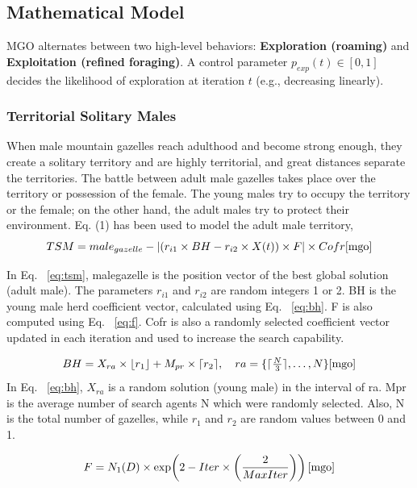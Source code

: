 \documentclass[12pt,a4paper]{article}
\begin{document}
\subsection{Mathematical Model}
MGO alternates between two high-level behaviors: \textbf{Exploration (roaming)} and \textbf{Exploitation (refined foraging)}. A control parameter $p_{exp}(t)\in[0,1]$ decides the likelihood of exploration at iteration $t$ (e.g., decreasing linearly).

\subsubsection{Territorial Solitary Males}
When male mountain gazelles reach adulthood and become strong
enough, they create a solitary territory and are highly territorial, and
great distances separate the territories. The battle between adult male
gazelles takes place over the territory or possession of the female. The
young males try to occupy the territory or the female; on the other hand,
the adult males try to protect their environment. Eq. (1) has been used to
model the adult male territory,
\begin{equation}
TSM = male_{gazelle} - \left| \left( r_{i1} \times BH - r_{i2} \times X(t) \right) \times F \right| \times Cofr \cite{mgo}
\label{eq:tsm}
\end{equation}


In Eq. ~\ref{eq:tsm}, malegazelle is the position vector of the best global solution
(adult male). The parameters $r_{i1}$
 and $r_{i2}$
 are random integers 1 or 2. BH is
the young male herd coefficient vector, calculated using Eq. ~\ref{eq:bh}. F is also
computed using Eq. ~\ref{eq:f}. Cofr is also a randomly selected coefficient
vector updated in each iteration and used to increase the search capability. 

\begin{equation}
BH = X_{ra} \times \lfloor r_1 \rfloor + M_{pr} \times \lceil r_2 \rceil, \quad 
ra = \{\lceil \tfrac{N}{3} \rceil, \ldots, N\} \cite{mgo}
\label{eq:bh}
\end{equation}
In Eq. ~\ref{eq:bh}, $X_{ra}$ is a random solution (young male) in the interval of ra.
Mpr is the average number of search agents N which were randomly
selected. Also, N is the total number of gazelles, while $r_{1}$ and $r_{2}$ are
random values between 0 and 1. 

\begin{equation}
F = N_1(D) \times \exp\!\left( 2 - Iter \times \left( \frac{2}{MaxIter} \right) \right) \cite{mgo}
\label{eq:f}
\end{equation}
\end{document}
